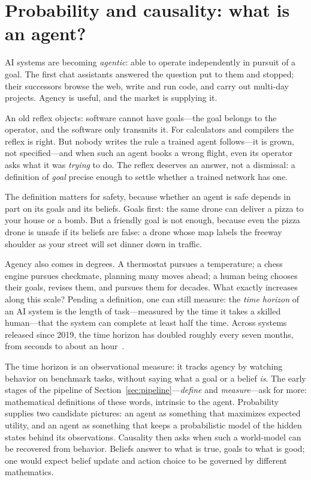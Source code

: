 \section{Probability and causality: what is an agent?}
\label{sec:epistemics}

AI systems are becoming \emph{agentic}: able to operate independently in pursuit of a goal. The first chat assistants answered the question put to them and stopped; their successors browse the web, write and run code, and carry out multi-day projects. Agency is useful, and the market is supplying it.

An old reflex objects: software cannot have goals---the goal belongs to the operator, and the software only transmits it. For calculators and compilers the reflex is right. But nobody writes the rule a trained agent follows---it is grown, not specified---and when such an agent books a wrong flight, even its operator asks what it was \emph{trying} to do. The reflex deserves an answer, not a dismissal: a definition of \emph{goal} precise enough to settle whether a trained network has one.

The definition matters for safety, because whether an agent is safe depends in part on its goals and its beliefs. Goals first: the same drone can deliver a pizza to your house or a bomb. But a friendly goal is not enough, because even the pizza drone is unsafe if its beliefs are false: a drone whose map labels the freeway shoulder as your street will set dinner down in traffic.

Agency also comes in degrees. A thermostat pursues a temperature; a chess engine pursues checkmate, planning many moves ahead; a human being chooses their goals, revises them, and pursues them for decades. What exactly increases along this scale? Pending a definition, one can still measure: the \emph{time horizon} of an AI system is the length of task---measured by the time it takes a skilled human---that the system can complete at least half the time. Across systems released since 2019, the time horizon has doubled roughly every seven months, from seconds to about an hour~\cite{kwa2025}.

The time horizon is an observational measure: it tracks agency by watching behavior on benchmark tasks, without saying what a goal or a belief \emph{is}. The early stages of the pipeline of Section~\ref{sec:pipeline}---\emph{define} and \emph{measure}---ask for more: mathematical definitions of these words, intrinsic to the agent. Probability supplies two candidate pictures: an agent as something that maximizes expected utility, and an agent as something that keeps a probabilistic model of the hidden states behind its observations. Causality then asks when such a world-model can be recovered from behavior. Beliefs answer to what is true, goals to what is good; one would expect belief update and action choice to be governed by different mathematics.

